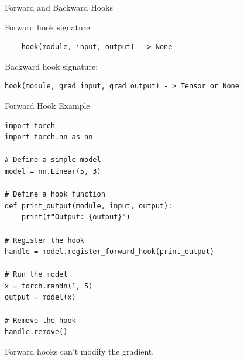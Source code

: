 \documentclass[aspectratio=169,xcolor=dvipsnames,svgnames,x11names,fleqn]{beamer}
\begin{document}
\begin{frame}[fragile]{Forward and Backward Hooks}


    Forward hook signature:
            \begin{verbatim}
    hook(module, input, output) - > None
            \end{verbatim}

            Backward hook signature:

                \begin{verbatim}
hook(module, grad_input, grad_output) - > Tensor or None
                \end{verbatim}
    
    
\end{frame}


\begin{frame}[fragile]{Forward Hook Example}
          \begin{verbatim}
import torch
import torch.nn as nn

# Define a simple model
model = nn.Linear(5, 3)

# Define a hook function
def print_output(module, input, output):
    print(f"Output: {output}")

# Register the hook
handle = model.register_forward_hook(print_output)

# Run the model
x = torch.randn(1, 5)
output = model(x)

# Remove the hook
handle.remove()
\end{verbatim}

Forward hooks can't modify the gradient.

\end{frame}
\end{document}
